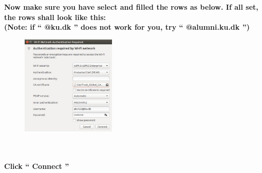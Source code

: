 \documentclass[a4paper]{article}
\begin{document}
\noindent
\textbf{Now make sure you have select and filled the rows as below. If all set, the rows shall look like this:}\\
\textbf{(Note: if `` @ku.dk '' does not work for you, try `` @alumni.ku.dk '')}\\
\begin{figure}[h!]
  \centering
  \includegraphics[width=0.4\textwidth]{pic4.jpg}
\end{figure}\\\\

\noindent
\textbf{Click `` Connect ''}
\end{document}
